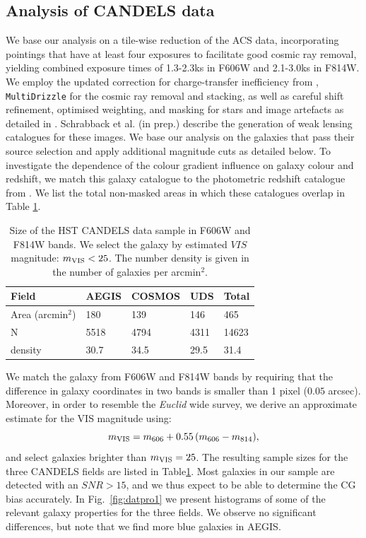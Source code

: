 \documentclass[useAMS,usenatbib]{mnras}
\newcommand{\be}{\begin{equation}}
\newcommand{\ee}{\end{equation}}
\begin{document}
\subsection{Analysis of CANDELS data}

We base our analysis on a tile-wise reduction of the ACS data, incorporating pointings that have at least four exposures to facilitate good cosmic ray removal, yielding combined exposure times of 1.3-2.3ks in F606W and 2.1-3.0ks in F814W.  We employ the updated correction for charge-transfer inefficiency from \cite{massey2014}, \texttt{MultiDrizzle} \citep{koekemoer2003} for the cosmic ray removal and stacking, as well as careful shift refinement, optimised weighting, and masking for stars and image artefacts as detailed in \cite{schrabback2010}.  Schrabback et al. (in prep.) describe the generation of weak lensing catalogues for these images.  We base our analysis on the galaxies that pass their source selection and apply
additional magnitude cuts as detailed below. To investigate the dependence of the colour gradient influence on galaxy colour and redshift, we match this galaxy catalogue to the photometric redshift catalogue from \cite{skelton14}.  We list the total non-masked areas in which these catalogues overlap in Table \ref{table:mag}.

\begin{center}
\begin{table}
  \begin{tabular}{lllll}
    \hline
    Field               &AEGIS   &COSMOS   &UDS  &Total\\
    \hline
    Area (arcmin$^2$)   &180    &139    &146   &465\\
    N                  &5518    &4794   &4311  &14623\\
    density            &30.7    &34.5   &29.5  &31.4\\
    \hline
  \end{tabular}
  \caption{\label{table:mag} Size of the HST CANDELS data sample in
    F606W and F814W bands. We select the galaxy by estimated $VIS$
    magnitude: $m_{\rm VIS}<25$. The number density is given in the number
    of galaxies per arcmin$^2$.}
\end{table}
\end{center}
%

We match the galaxy from F606W and F814W bands by requiring that the difference in galaxy coordinates 
in two bands is smaller than 1 pixel ($0.05$ arcsec). Moreover, in order to resemble the {\it Euclid} 
wide survey, we derive an approximate estimate for the VIS magnitude using:
\be
m_{\rm VIS}=m_{606}+ 0.55\,(m_{606}-m_{814}),
\ee
and select galaxies brighter than $m_{\rm VIS}=25$. The resulting sample sizes for the 
three CANDELS fields are listed in Table\ref{table:mag}. Most galaxies in our sample are detected with an $SNR>15$, and we thus  expect to be able to determine the CG bias accurately. In Fig.~\ref{fig:datpro1} we present histograms of some of the relevant galaxy properties for the three fields. We observe no significant differences, but note that we find more blue galaxies in AEGIS.
\end{document}
